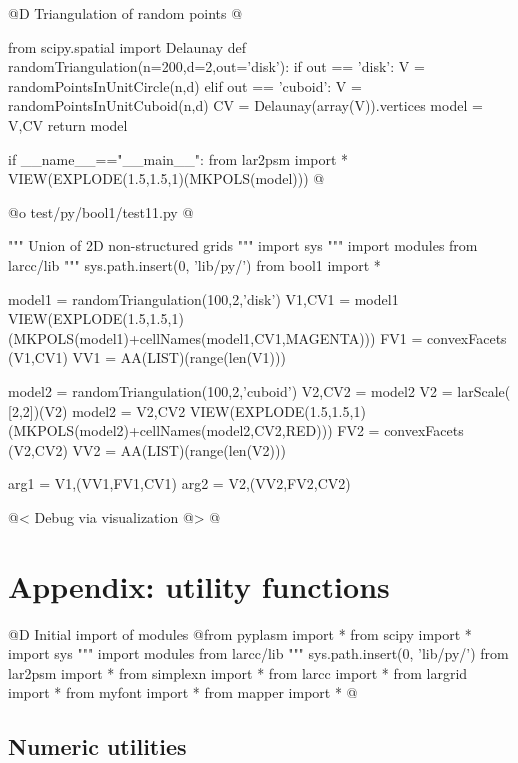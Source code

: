 \documentclass[11pt,oneside]{article}	%
\begin{document}
@D Triangulation of random points
@{from scipy.spatial import Delaunay
def randomTriangulation(n=200,d=2,out='disk'):
	if out == 'disk':
		V = randomPointsInUnitCircle(n,d)
	elif out == 'cuboid':
		V = randomPointsInUnitCuboid(n,d)
	CV = Delaunay(array(V)).vertices
	model = V,CV
	return model

if __name__=="__main__":
	from lar2psm import *
	VIEW(EXPLODE(1.5,1.5,1)(MKPOLS(model)))
@}



@o test/py/bool1/test11.py
@{""" Union of 2D non-structured grids """
import sys
""" import modules from larcc/lib """
sys.path.insert(0, 'lib/py/')
from bool1 import *

model1 = randomTriangulation(100,2,'disk')
V1,CV1 = model1
VIEW(EXPLODE(1.5,1.5,1)(MKPOLS(model1)+cellNames(model1,CV1,MAGENTA)))
FV1 = convexFacets (V1,CV1)
VV1 = AA(LIST)(range(len(V1)))

model2 = randomTriangulation(100,2,'cuboid')
V2,CV2 = model2
V2 = larScale( [2,2])(V2)
model2 = V2,CV2 
VIEW(EXPLODE(1.5,1.5,1)(MKPOLS(model2)+cellNames(model2,CV2,RED)))
FV2 = convexFacets (V2,CV2)
VV2 = AA(LIST)(range(len(V2)))

arg1 = V1,(VV1,FV1,CV1)
arg2 = V2,(VV2,FV2,CV2)

@< Debug via visualization @>
@}


\appendix
\section{Appendix: utility functions}
@D Initial import of modules
@{from pyplasm import *
from scipy import *
import sys
""" import modules from larcc/lib """
sys.path.insert(0, 'lib/py/')
from lar2psm import *
from simplexn import *
from larcc import *
from largrid import *
from myfont import *
from mapper import *
@}
\subsection{Numeric utilities}
\end{document}
